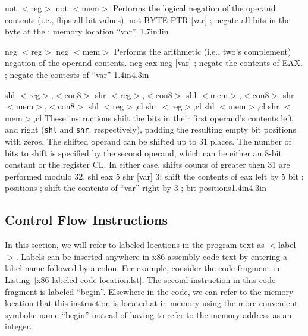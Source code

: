 {not $<$reg$>$ \newline not $<$mem$>$}
{Performs the logical negation of the operand contents (i.e., flips all bit values).}
{not BYTE PTR [var]}
{; negate all bits in the byte at the \newline ; memory location ``var''.}
{1.7in}{4in}

{neg $<$reg$>$ \newline neg $<$mem$>$}
{Performs the arithmetic (i.e., two's complement) negation of the operand contents.}
{neg eax \newline neg [var]}
{; negate the contents of EAX. \newline ; negate the contests of ``var''}
{1.4in}{4.3in}

{shl $<$reg$>$,$<$con8$>$ \hspace{0.5in} shr $<$reg$>$,$<$con8$>$\newline
shl $<$mem$>$,$<$con8$>$ \hspace{0.5in} shr $<$mem$>$,$<$con8$>$\newline
shl $<$reg$>$,cl \hspace{0.92in} shr $<$reg$>$,cl\newline
shl $<$mem$>$,cl \hspace{0.92in} shr $<$mem$>$,cl}
{These instructions shift the bits in their first operand's contents
  left and right ({\tt shl} and {\tt shr}, respectively), padding the
  resulting empty bit positions with zeros. The shifted operand can be
  shifted up to 31 places. The number of bits to shift is specified
  by the second operand, which can be either an 8-bit constant or the
  register CL. In either case, shifts counts of greater then 31 are
  performed modulo 32.}
{shl eax 5 \newline\newline shr [var] 3}{; shift the contents of eax left by 5 bit \newline ; positions \newline ; shift the contents of ``var'' right by 3 \newline ; bit positions}{1.4in}{4.3in}

\subsection{Control Flow Instructions}

In this section, we will refer to labeled locations in the program
text as $<$label$>$. Labels can be inserted anywhere in x86 assembly
code text by entering a label name followed by a colon. For example,
consider the code fragment in Listing~\ref{x86-labeled-code-location.lst}.
The second instruction in this code fragment is labeled ``begin''.
Elsewhere in the code, we can refer to the memory location that this
instruction is located at in memory using the more convenient symbolic
name ``begin'' instead of having to refer to the memory address as an
integer.

